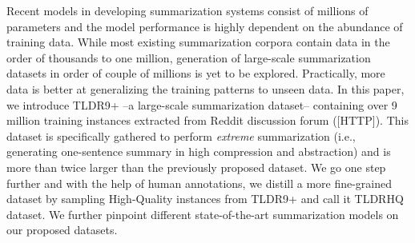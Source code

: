 Recent models in developing summarization systems consist of millions of parameters and the model performance is highly dependent on the abundance of training data. While most existing summarization corpora contain data in the order of thousands to one million, generation of large-scale summarization datasets in order of couple of millions is yet to be explored. Practically, more data is better at generalizing the training patterns to unseen data. In this paper, we introduce TLDR9+ --a large-scale summarization dataset-- containing over 9 million training instances extracted from Reddit discussion forum ([HTTP]). This dataset is specifically gathered to perform \textit{extreme} summarization (i.e., generating one-sentence summary in high compression and abstraction) and is more than twice larger than the previously proposed dataset. We go one step further and with the help of human annotations, we distill a more fine-grained dataset by sampling High-Quality instances from TLDR9+ and call it TLDRHQ dataset. We further pinpoint different state-of-the-art summarization models on our proposed datasets.
